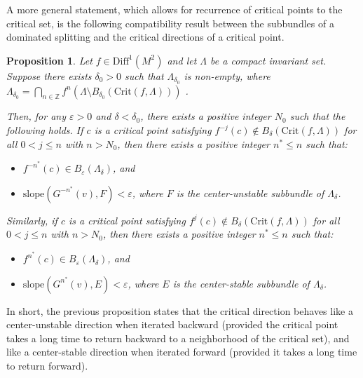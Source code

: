 \documentclass[a4paper,11pt]{article}
\newtheorem{proposition}[lemma]{Proposition}
\theoremstyle{definition}
\begin{document}
A more general statement, which allows for recurrence of critical points to the critical set, is the following compatibility result between the subbundles of a dominated splitting and the critical directions of a critical point.


\begin{proposition}\label{pr:compatibility} Let $f\in \mathrm{Diff}^1(M^2)$ and let $\Lambda$ be a compact invariant set. Suppose there exists $\delta_0>0$ such that $\Lambda_{\delta_0}$ is non-empty, where $\Lambda_{\delta_0}=\bigcap_{n\in \mathbb{Z}} f^n\!\left(\Lambda\setminus B_{\delta_0}(\mathrm{Crit}(f, \Lambda))\right)$ .

Then, for any $\varepsilon>0$ and $\delta<\delta_0$, there exists a positive integer $N_0$ such that the following holds. If $c$ is a critical point satisfying $f^{-j}(c)\notin B_{\delta}(\mathrm{Crit}(f,\Lambda))$ for all $0<j\leq n$ with $n>N_0$, then there exists a positive integer $n^*\leq n$ such that:
\begin{itemize}
    \item[--] $f^{-n^*}(c)\in B_\varepsilon(\Lambda_{\delta})$, and
    \item[--]  $\mathrm{slope}(G^{-n^*}(v), F)< \varepsilon$, where $F$ is the center-unstable subbundle of $\Lambda_{\delta}$.
\end{itemize}
Similarly, if $c$ is a critical point satisfying $f^{j}(c)\notin B_\delta(\mathrm{Crit}(f,\Lambda))$ for all $0< j\leq n$ with $n>N_0$, then there exists a positive integer $n^*\leq n$ such that:
\begin{itemize}
    \item[--] $f^{n^*}(c)\in B_\varepsilon(\Lambda_\delta)$, and
    \item[--]   $\mathrm{slope}(G^{n^*}(v), E)< \varepsilon$, where $E$ is the center-stable subbundle of $\Lambda_\delta$.
\end{itemize}




\end{proposition}




In short, the previous proposition states that the critical direction behaves like a center-unstable direction when iterated backward (provided the critical point takes a long time to return backward to a neighborhood of the critical set), and like a center-stable direction when iterated forward (provided it takes a long time to return forward).
\end{document}
